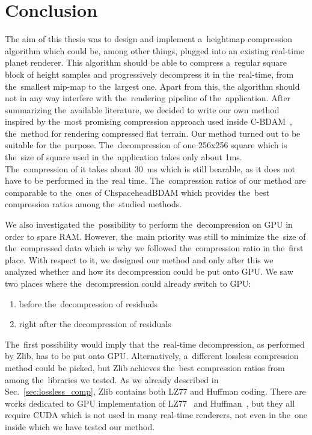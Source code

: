 \chapter{Conclusion}\label{sec:conclusion}

The aim of this thesis was to design and implement a~heightmap compression algorithm which could be, among other things, plugged into an existing real-time planet renderer. This algorithm should be able to compress a~regular square block of height samples and progressively decompress it in the~real-time, from the~smallest mip-map to the~largest one. Apart from this, the algorithm should not in any way interfere with the~rendering pipeline of the~application. After summarizing the~available literature, we decided to write our own method inspired by the~most promising compression approach used inside C-BDAM~\cite{cbdam}, the~method for rendering compressed flat terrain. Our method turned out to be suitable for the~purpose. The~decompression of one 256x256 square which is the~size of square used in the~application takes only about 1ms. The~compression of it takes about 30~ms which is still bearable, as it does not have to be performed in the~real time. The~compression ratios of our method are comparable to the~ones of ChspaceheadBDAM which provides the~best compression ratios among the~studied methods.

We also investigated the~possibility to perform the~decompression on GPU in order to spare RAM. However, the~main priority was still to minimize the~size of the~compressed data which is why we followed the~compression ratio in the~first place. With respect to it, we designed our method and only after this we analyzed whether and how its decompression could be put onto GPU. We saw two places where the~decompression could already switch to GPU:
\begin{enumerate}
	\item{before the~decompression of residuals}
	\item{right after the decompression of residuals}
\end{enumerate}

The~first possibility would imply that the~real-time decompression, as performed by Zlib, has to be put onto GPU. Alternatively, a~different lossless compression method could be picked, but Zlib achieves the~best compression ratios from among the~libraries we tested. As we already described in Sec.~\ref{sec:lossless_comp}, Zlib contains both LZ77 and Huffman coding. There are works dedicated to GPU implementation of LZ77~\cite{gpuLZ77Cuda1} and Huffman~\cite{gpuHuffman1, gpuHuffmanCuda1}, but they all require CUDA which is not used in many real-time renderers, not even in the~one inside which we have tested our method.

